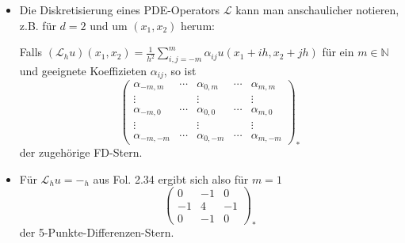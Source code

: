\documentclass{book}
\newcommand{\tmtextbf}[1]{\text{{\bfseries{#1}}}}
\newenvironment{itemizedot}{\begin{itemize} \renewcommand{\labelitemi}{$\bullet$}\renewcommand{\labelitemii}{$\bullet$}\renewcommand{\labelitemiii}{$\bullet$}\renewcommand{\labelitemiv}{$\bullet$}}{\end{itemize}}
\newcommand{\nonconverted}[1]{\mbox{}}
\begin{document}
\begin{remark*}
  \tmtextbf{(FD-Stern)}
  \begin{itemizedot}
    \item Die Diskretisierung eines PDE-Operators $\mathscr{L}$ kann man
    anschaulicher notieren, z.B. f{\"u}r $d = 2$ und um $(x_1, x_2)$ herum:
    
    Falls $(\mathcal{\mathscr{L}}_h u) (x_1, x_2) = \frac{1}{h^2} \sum_{i, j =
    - m}^m \alpha_{i j} u (x_1 + i h, x_2 + j h)$ f{\"u}r ein $m \in
    \mathbb{N}$ und geeignete Koeffizieten $\alpha_{i j}$, so ist
    \begin{equation}
      \left(\begin{array}{ccccc}
        \alpha_{- m, m} & \cdots & \alpha_{0, m} & \cdots & \alpha_{m, m}\\
        \vdots &  & \vdots &  & \vdots\\
        \alpha_{- m, 0} & \cdots & \alpha_{0, 0} & \cdots & \alpha_{m, 0}\\
        \vdots &  & \vdots &  & \vdots\\
        \alpha_{- m, - m} & \cdots & \alpha_{0, - m} & \cdots & \alpha_{m, -
        m}
      \end{array}\right)_{\ast}
    \end{equation}
    der zugeh{\"o}rige FD-Stern.
    
    \item F{\"u}r $\mathcal{\mathscr{L}}_h u = -
    \nonconverted{bigtriangleup}_h$ aus Fol. 2.34 ergibt sich also f{\"u}r $m
    = 1$
    \[ \left(\begin{array}{ccc}
         0 & - 1 & 0\\
         - 1 & 4 & - 1\\
         0 & - 1 & 0
       \end{array}\right)_{\ast} \]
    der 5-Punkte-Differenzen-Stern.
    

\end{itemizedot}
\end{remark*}
\end{document}
